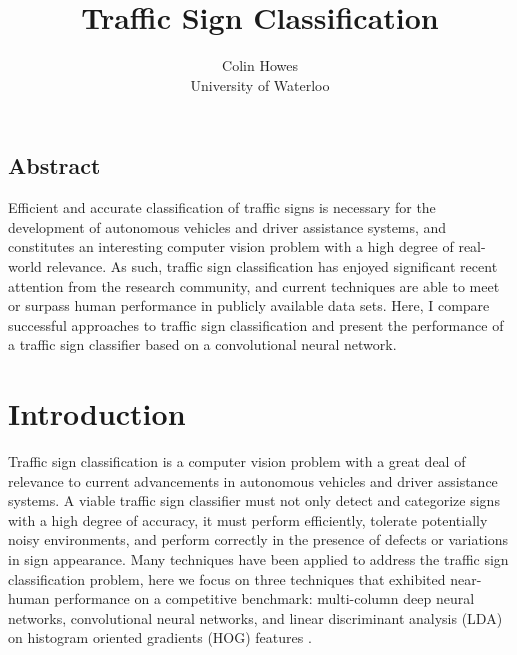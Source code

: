 \documentclass[letterpaper,twocolumn,10pt]{article}
\begin{document}
\date{}

\title{\Large \bf Traffic Sign Classification}

\author{
	{\rm Colin Howes}\\
	University of Waterloo
} %

\maketitle

\thispagestyle{empty}


\subsection*{Abstract}

Efficient and accurate classification of traffic signs is necessary for the development of autonomous vehicles and driver assistance systems, and constitutes an interesting computer vision problem with a high degree of real-world relevance. As such, traffic sign classification has enjoyed significant recent attention from the research community, and current techniques are able to meet or surpass human performance in publicly available data sets. Here, I compare successful approaches to traffic sign classification and present the performance of a traffic sign classifier based on a convolutional neural network.


\section{Introduction}

Traffic sign classification is a computer vision problem with a great deal of relevance to current advancements in autonomous vehicles and driver assistance systems. A viable traffic sign classifier must not only detect and categorize signs with a high degree of accuracy, it must perform efficiently, tolerate potentially noisy environments, and perform correctly in the presence of defects or variations in sign appearance. Many techniques have been applied to address the traffic sign classification problem, here we focus on three techniques that exhibited near-human performance on a competitive benchmark: multi-column deep neural networks, convolutional neural networks, and linear discriminant analysis (LDA) on histogram oriented gradients (HOG) features \cite{stallkamp_german_2011, stallkamp_man_2012, ciresan_committee_2011, sermanet_traffic_2011, ciresan_multi-column_2012}.
\end{document}
